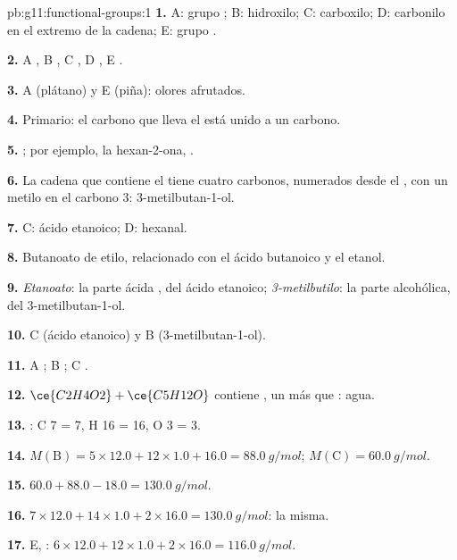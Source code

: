 \begin{solution}{pb:g11:functional-groups:1}
\textbf{1.} A: grupo ; B: hidroxilo; C: carboxilo; D: carbonilo en
el extremo de la cadena; E: grupo .

\textbf{2.} A , B , C , D , E
.

\textbf{3.} A (plátano) y E (piña): olores afrutados.

\textbf{4.} Primario: el carbono que lleva el  está unido a un
carbono.

\textbf{5.} ; por ejemplo, la hexan-2-ona,
.

\textbf{6.} La cadena que contiene el  tiene cuatro carbonos,
numerados desde el , con un metilo en el carbono 3:
3-metilbutan-1-ol.

\textbf{7.} C: ácido etanoico; D: hexanal.

\textbf{8.} Butanoato de etilo, relacionado con el ácido butanoico y el
etanol.

\textbf{9.} \emph{Etanoato}: la parte ácida , del ácido
etanoico; \emph{3-metilbutilo}: la parte alcohólica, del
3-metilbutan-1-ol.

\textbf{10.} C (ácido etanoico) y B (3-metilbutan-1-ol).

\textbf{11.} A ; B ; C .

\textbf{12.} $\ce{C2H4O2} + \ce{C5H12O}$ contiene , un
 más que : agua.

\textbf{13.} : C 7 = 7, H 16 = 16,
O 3 = 3.

\textbf{14.} $M(\text{B}) = 5 \times 12.0 + 12 \times 1.0 + 16.0 =
\qty{88.0}{g/mol}$; $M(\text{C}) = \qty{60.0}{g/mol}$.

\textbf{15.} $60.0 + 88.0 - 18.0 = \qty{130.0}{g/mol}$.

\textbf{16.} $7 \times 12.0 + 14 \times 1.0 + 2 \times 16.0 =
\qty{130.0}{g/mol}$: la misma.

\textbf{17.} E, : $6 \times 12.0 + 12 \times 1.0 + 2 \times
16.0 = \qty{116.0}{g/mol}$.


\end{solution}
